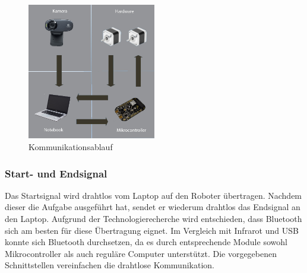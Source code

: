 \begin{figure}[h!]          
	\centering             
	\includegraphics[width=0.5\textwidth]{fig/kommunikationsablauf.jpg}    
	\caption{Kommunikationsablauf}
	
	\label{fig:Kommunikationsablauf}
\end{figure}
\noindent
\subsubsection{Start- und Endsignal}
Das Startsignal wird drahtlos vom Laptop auf den Roboter übertragen. Nachdem 
dieser die Aufgabe ausgeführt hat, sendet er wiederum drahtlos das Endsignal 
an den Laptop. Aufgrund der Technologierecherche wird entschieden, dass 
Bluetooth sich am besten für diese Übertragung eignet. Im Vergleich mit 
Infrarot und USB konnte sich Bluetooth durchsetzen, da es durch entsprechende 
Module sowohl Mikrocontroller als 
auch reguläre Computer unterstützt. Die vorgegebenen Schnittstellen 
vereinfachen die drahtlose Kommunikation.
